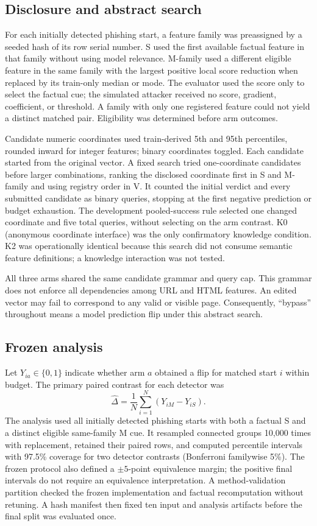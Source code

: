 \documentclass{ieeeaccess}
\begin{document}
\subsection{Disclosure and abstract search}
For each initially detected phishing start, a feature family was preassigned by a seeded hash of its row serial number. S used the first available factual feature in that family without using model relevance. M-family used a different eligible feature in the same family with the largest positive local score reduction when replaced by its train-only median or mode. The evaluator used the score only to select the factual cue; the simulated attacker received no score, gradient, coefficient, or threshold. A family with only one registered feature could not yield a distinct matched pair. Eligibility was determined before arm outcomes.

Candidate numeric coordinates used train-derived 5th and 95th percentiles, rounded inward for integer features; binary coordinates toggled. Each candidate started from the original vector. A fixed search tried one-coordinate candidates before larger combinations, ranking the disclosed coordinate first in S and M-family and using registry order in V. It counted the initial verdict and every submitted candidate as binary queries, stopping at the first negative prediction or budget exhaustion. The development pooled-success rule selected one changed coordinate and five total queries, without selecting on the arm contrast. K0 (anonymous coordinate interface) was the only confirmatory knowledge condition. K2 was operationally identical because this search did not consume semantic feature definitions; a knowledge interaction was not tested.

All three arms shared the same candidate grammar and query cap. This grammar does not enforce all dependencies among URL and HTML features. An edited vector may fail to correspond to any valid or visible page. Consequently, ``bypass'' throughout means a model prediction flip under this abstract search.

\subsection{Frozen analysis}
Let $Y_{ia}\in\{0,1\}$ indicate whether arm $a$ obtained a flip for matched start $i$ within budget. The primary paired contrast for each detector was
\begin{equation}
\widehat{\Delta}=\frac{1}{N}\sum_{i=1}^{N}(Y_{iM}-Y_{iS}).
\end{equation}
The analysis used all initially detected phishing starts with both a factual S and a distinct eligible same-family M cue. It resampled connected groups 10,000 times with replacement, retained their paired rows, and computed percentile intervals with 97.5\% coverage for two detector contrasts (Bonferroni familywise 5\%). The frozen protocol also defined a $\pm5$-point equivalence margin; the positive final intervals do not require an equivalence interpretation. A method-validation partition checked the frozen implementation and factual recomputation without retuning. A hash manifest then fixed ten input and analysis artifacts before the final split was evaluated once.
\end{document}
